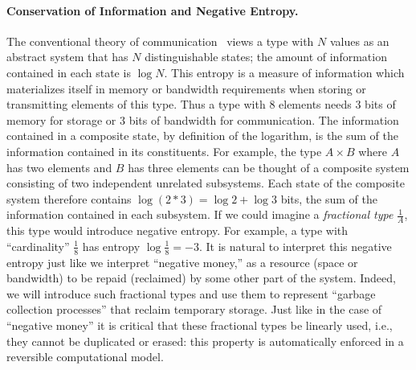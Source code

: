 \documentclass[sigplan,10pt,review,anonymous]{acmart}
\begin{document}
\paragraph*{Conservation of Information and Negative Entropy.}
The conventional theory of
communication~\cite{Shannon1948} views a type with $N$ values as
an abstract system that has $N$ distinguishable states; the
amount of information contained in each state is $\log{N}$. This
entropy is a measure of information which materializes itself in
memory or bandwidth requirements when storing or transmitting elements
of this type. Thus a type with 8 elements needs 3 bits of memory for
storage or 3 bits of bandwidth for communication. The information
contained in a composite state, by definition of the logarithm,
is the sum of the information contained in its constituents. For example,
the type $A \times B$ where $A$ has two elements and $B$ has three elements can
be thought of a composite system consisting of two independent
unrelated subsystems.  Each state of the composite system therefore
contains $\log{(2*3)} = \log{2} + \log{3}$ bits, the sum of
the information contained in each subsystem. If we could imagine a
\emph{fractional type} $\frac{1}{A}$, this type would introduce
negative entropy. For example, a type with ``cardinality''
$\frac{1}{8}$ has entropy $\log{\frac{1}{8}} = -3$. It is natural to
interpret this negative entropy just like we interpret ``negative
money,'' as a resource (space or bandwidth) to be repaid (reclaimed)
by some other part of the system. Indeed, we will introduce such
fractional types and use them to represent ``garbage collection
processes'' that reclaim temporary storage. Just like in the case of
``negative money'' it is critical that these fractional types be
linearly used, i.e., they cannot be duplicated or erased: this
property is automatically enforced in a reversible
computational model.
\end{document}
